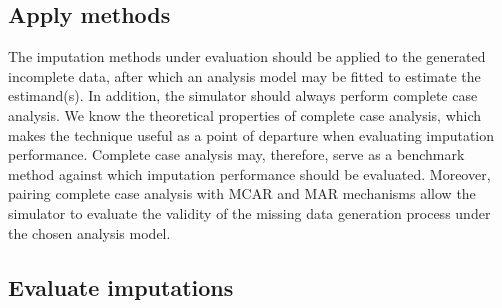 \documentclass[bimj,fleqn]{w-art}
\begin{document}

\subsection{Apply methods}


The imputation methods under evaluation should be applied to the generated incomplete data, after which an analysis model may be fitted to estimate the estimand(s). %
In addition, the simulator should always perform complete case analysis. We know the theoretical properties of complete case analysis, which makes the technique useful as a point of departure when evaluating imputation performance. Complete case analysis may, therefore, serve as a benchmark method against which imputation performance should be evaluated. Moreover, pairing complete case analysis with MCAR and MAR mechanisms allow the simulator to evaluate the validity of the missing data generation process under the chosen analysis model.%


\subsection{Evaluate imputations}

\end{document}
